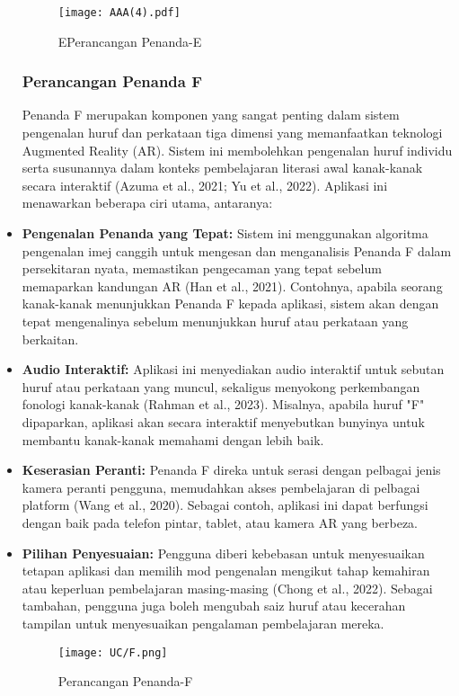 \begin{itemize}
\begin{figure}
    \centering
    \texttt{[image: AAA(4).pdf]}
    \caption{EPerancangan Penanda-E}
    \label{fig:eE}
\end{figure}

\subsubsection{Perancangan Penanda F}

  
Penanda F merupakan komponen yang sangat penting dalam sistem pengenalan huruf dan perkataan tiga dimensi yang memanfaatkan teknologi Augmented Reality (AR). Sistem ini membolehkan pengenalan huruf individu serta susunannya dalam konteks pembelajaran literasi awal kanak-kanak secara interaktif (Azuma et al., 2021; Yu et al., 2022). Aplikasi ini menawarkan beberapa ciri utama, antaranya:  \\
 
\item \textbf{Pengenalan Penanda yang Tepat:} Sistem ini menggunakan algoritma pengenalan imej canggih untuk mengesan dan menganalisis Penanda F dalam persekitaran nyata, memastikan pengecaman yang tepat sebelum memaparkan kandungan AR (Han et al., 2021). Contohnya, apabila seorang kanak-kanak menunjukkan Penanda F kepada aplikasi, sistem akan dengan tepat mengenalinya sebelum menunjukkan huruf atau perkataan yang berkaitan.  \\
\item \textbf{Audio Interaktif:} Aplikasi ini menyediakan audio interaktif untuk sebutan huruf atau perkataan yang muncul, sekaligus menyokong perkembangan fonologi kanak-kanak (Rahman et al., 2023). Misalnya, apabila huruf "F" dipaparkan, aplikasi akan secara interaktif menyebutkan bunyinya untuk membantu kanak-kanak memahami dengan lebih baik.  \\
\item \textbf{Keserasian Peranti:} Penanda F direka untuk serasi dengan pelbagai jenis kamera peranti pengguna, memudahkan akses pembelajaran di pelbagai platform (Wang et al., 2020). Sebagai contoh, aplikasi ini dapat berfungsi dengan baik pada telefon pintar, tablet, atau kamera AR yang berbeza.  \\
\item \textbf{Pilihan Penyesuaian:} Pengguna diberi kebebasan untuk menyesuaikan tetapan aplikasi dan memilih mod pengenalan mengikut tahap kemahiran atau keperluan pembelajaran masing-masing (Chong et al., 2022). Sebagai tambahan, pengguna juga boleh mengubah saiz huruf atau kecerahan tampilan untuk menyesuaikan pengalaman pembelajaran mereka.  \\
\begin{figure}
    \centering
    \texttt{[image: UC/F.png]}
    \caption{Perancangan Penanda-F}
    \label{fig:F}
\end{figure}




\end{itemize}
